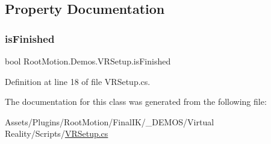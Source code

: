 \subsection{Property Documentation}
\mbox{\label{class_root_motion_1_1_demos_1_1_v_r_setup_a55a66c18dea1af5dfb0ea1dfe6635d83}} 
\subsubsection{\texorpdfstring{is\+Finished}{isFinished}}
{\footnotesize\ttfamily bool Root\+Motion.\+Demos.\+V\+R\+Setup.\+is\+Finished\hspace{0.3cm}{\ttfamily [get]}}



Definition at line 18 of file V\+R\+Setup.\+cs.



The documentation for this class was generated from the following file\+:\begin{DoxyCompactItemize}
\item 
Assets/\+Plugins/\+Root\+Motion/\+Final\+I\+K/\+\_\+\+D\+E\+M\+O\+S/\+Virtual Reality/\+Scripts/\mbox{\hyperlink{_v_r_setup_8cs}{V\+R\+Setup.\+cs}}\end{DoxyCompactItemize}
